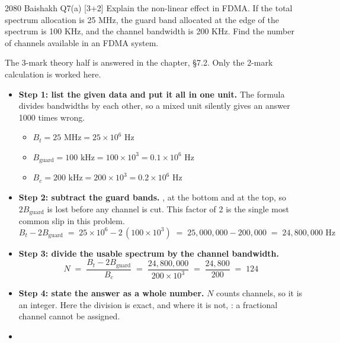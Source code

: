 \begin{asked}{2080 Baishakh \textperiodcentered{} Q7(a) \textperiodcentered{} [3+2]}
Explain the non-linear effect in FDMA. If the total spectrum allocation is 25 MHz, the guard
band allocated at the edge of the spectrum is 100 KHz, and the channel bandwidth is 200 KHz.
Find the number of channels available in an FDMA system.
\par\vspace{1pt}
{\color{sub}The 3-mark theory half is answered in the chapter, \S7.2. Only the 2-mark
calculation is worked here.}
\end{asked}

\begin{itemize}
  \item \textbf{Step 1: list the given data and put it all in one unit.} The formula divides
        bandwidths by each other, so a mixed unit silently gives an answer 1000 times wrong.
  \begin{itemize}
    \item $B_t = 25 \text{ MHz} = 25 \times 10^6$ Hz
    \item $B_{\text{guard}} = 100 \text{ kHz} = 100 \times 10^3 = 0.1 \times 10^6$ Hz
    \item $B_c = 200 \text{ kHz} = 200 \times 10^3 = 0.2 \times 10^6$ Hz
  \end{itemize}
  \item \textbf{Step 2: subtract the guard bands.} , at the bottom and at the top, so $2 B_{\text{guard}}$ is lost before
        any channel is cut. This factor of 2 is the single most common slip in this problem.
        \[ B_t - 2B_{\text{guard}} \;=\; 25 \times 10^6 - 2\,(100 \times 10^3)
           \;=\; 25{,}000{,}000 - 200{,}000 \;=\; 24{,}800{,}000 \text{ Hz} \]
  \item \textbf{Step 3: divide the usable spectrum by the channel bandwidth.}
        \[ N \;=\; \frac{B_t - 2B_{\text{guard}}}{B_c}
           \;=\; \frac{24{,}800{,}000}{200 \times 10^3}
           \;=\; \frac{24{,}800}{200} \;=\; 124 \]
  \item \textbf{Step 4: state the answer as a whole number.} $N$ counts channels, so it is an
        integer. Here the division is exact, and where it is not, : a
        fractional channel cannot be assigned.
  \item {}
\end{itemize}

